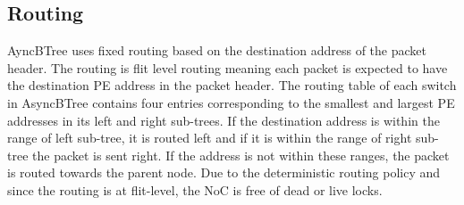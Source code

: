\subsection{Routing}
\label{sec:routing}
AyncBTree uses fixed routing based on the destination address of the packet header.
The routing is flit level routing meaning each packet is expected to have the destination PE address in the packet header.
The routing table of each switch in AsyncBTree contains four entries corresponding to the smallest and largest PE addresses in its left and right sub-trees.
If the destination address is within the range of left sub-tree, it is routed left and if it is within the range of right sub-tree the packet is sent right.
If the address is not within these ranges, the packet is routed towards the parent node.
Due to the deterministic routing policy and since the routing is at flit-level, the NoC is free of dead or live locks.

%



